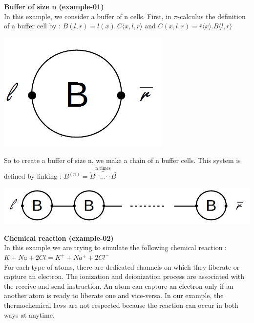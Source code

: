 \documentclass[11pt]{report}
\begin{document}
\vspace*{15pt}
{}
\tabto{0cm} {\LARGE \textbf{Buffer of size n (example-01)}}
\vspace*{3pt}
\vspace*{10pt}
\\
In this example, we consider a buffer of n cells. First, in $\pi$-calculus the definition of a buffer cell by :
$B(l,r) = l(x).C \langle x,l,r \rangle$ and $C(x,l,r) = \bar{r} \langle x \rangle .B \langle l,r \rangle$

\begin{center}
\includegraphics[scale = 0.25]{BufferCell.png}
\end{center}
So to create a buffer of size n, we make a chain of n buffer cells. This system is defined by linking :
$B^{(n)} = \overbrace{B^{ \frown} \ldots ^{\frown} B}^{\text{n times}}$

\begin{center}
\includegraphics[scale = 0.4]{Buffern.png}
\end{center}

\newpage

{}
\tabto{0cm} {\LARGE \textbf{Chemical reaction (example-02)}}
\vspace*{3pt}
\vspace*{10pt}
\\
In this example we are trying to simulate the following chemical reaction : \\
$K + Na + 2Cl = K^+ + Na^+ + 2Cl^-$ \\
For each type of atoms, there are dedicated channels on which they liberate or capture an electron. The ionization and deionization process are associated with the receive and send instruction. An atom can capture an electron only if an another atom is ready to liberate one and vice-versa. In our example, the thermochemical laws are not respected because the reaction can occur in both ways at anytime.  
\end{document}
